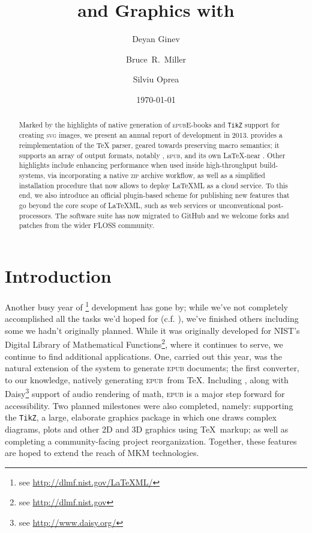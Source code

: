 \documentclass{llncs}
\title{\ebooks and Graphics with \LaTeXML}
\author{Deyan Ginev\inst{1} \and Bruce~R.~Miller\inst{2} \and Silviu Oprea\inst{3}}
\institute{Computer Science, Jacobs University Bremen, Germany
 \and National Institute of Standards and Technology, Gaithersburg, MD, USA
 \and Department of Computer Science, University of Oxford, Oxford, UK}
\date{\today}
\def\ebooks{\mbox{E-books}\xspace}
\def\epub{\textsc{epub}\xspace}
\def\svg{\textsc{svg}\xspace}
\def\zip{\textsc{zip}\xspace}
\def\tikz{\texttt{TikZ}\xspace}
\begin{document}
\maketitle
\begin{abstract} 
Marked by the highlights of native generation of \epub \ebooks and \tikz support for creating \svg images, we present an annual report of {\LaTeXML} development in 2013. {\LaTeXML} provides a reimplementation of the {\TeX} parser, geared towards preserving macro semantics;
it supports an array of output formats, notably , \epub, {\XHTML} and its own \LaTeX-near \XML.
Other highlights include enhancing performance when used inside high-throughput build-systems, via incorporating a native \zip archive workflow, as well as a simplified installation procedure that now allows to deploy LaTeXML as a cloud service. To this end, we also introduce an official plugin-based scheme for publishing new features that go beyond the core scope of LaTeXML, such as web services or unconventional post-processors.
The software suite has now migrated to GitHub and we welcome forks and patches from the wider FLOSS community.
\end{abstract}

\section{Introduction}
Another busy year of {\LaTeXML}\footnote{see \url{http://dlmf.nist.gov/LaTeXML/}} development has gone by;
while we've not completely accomplished all the tasks we'd hoped for (c.f. \cite{GinMil:latexmlCICM13}),
we've finished others including some we hadn't originally planned.
While it was originally developed for NIST's Digital Library of Mathematical Functions\footnote{see \url{http://dlmf.nist.gov}},
where it continues to serve, we continue to find additional applications.
One, carried out this year, was the natural extension of the system to generate \epub documents;
the first converter, to our knowledge, natively generating \epub\ from \TeX.  
Including \MathML, along with Daisy\footnote{see \url{http://www.daisy.org/}}
support of audio rendering of math, \epub is a major step forward for
accessibility. 
Two planned milestones were also completed, namely: supporting the \tikz, a large, elaborate
graphics package in which one draws complex diagrams, plots and other 2D and 3D graphics
using \TeX\ markup; as well as completing a community-facing project reorganization.
Together, these features are hoped to extend the reach of MKM technologies.
\end{document}
